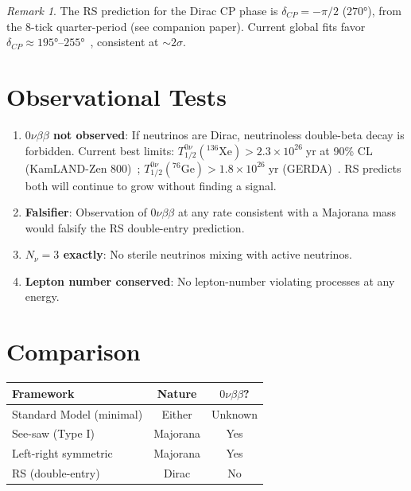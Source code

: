 \documentclass[12pt,a4paper]{article}
\theoremstyle{definition}
\theoremstyle{remark}
\newtheorem{remark}[theorem]{Remark}
\begin{document}
\begin{remark}
The RS prediction for the Dirac CP phase is
$\delta_{CP} = -\pi/2$ ($270°$), from the 8-tick
quarter-period (see companion paper).  Current
global fits favor $\delta_{CP} \approx 195°$--$255°$~\cite{PDG2022},
consistent at $\sim 2\sigma$.
\end{remark}

\section{Observational Tests}
\label{sec:tests}

\begin{enumerate}
  \item \textbf{$0\nu\beta\beta$ not observed}: If neutrinos
  are Dirac, neutrinoless double-beta decay is forbidden.
  Current best limits:
  $T_{1/2}^{0\nu}(^{136}\mathrm{Xe}) > 2.3 \times
  10^{26}\;\mathrm{yr}$ at 90\% CL
  (KamLAND-Zen 800)~\cite{KamLANDZen2022};
  $T_{1/2}^{0\nu}(^{76}\mathrm{Ge}) > 1.8 \times 10^{26}
  \;\mathrm{yr}$ (GERDA)~\cite{GERDA2020}.  RS predicts both
  will continue to grow without finding a signal.

  \item \textbf{Falsifier}: Observation of $0\nu\beta\beta$ at
  any rate consistent with a Majorana mass would falsify the RS
  double-entry prediction.

  \item \textbf{$N_\nu = 3$ exactly}: No sterile neutrinos
  mixing with active neutrinos.

  \item \textbf{Lepton number conserved}: No lepton-number
  violating processes at any energy.
\end{enumerate}

\section{Comparison}
\label{sec:comparison}

\begin{center}
\renewcommand{\arraystretch}{1.3}
\begin{tabular}{@{}lcc@{}}
\toprule
\textbf{Framework} & \textbf{Nature} &
\textbf{$0\nu\beta\beta$?} \\
\midrule
Standard Model (minimal) & Either & Unknown \\
See-saw (Type I) & Majorana & Yes \\
Left-right symmetric & Majorana & Yes \\
RS (double-entry) & Dirac & No \\
\bottomrule
\end{tabular}
\end{center}
\end{document}
